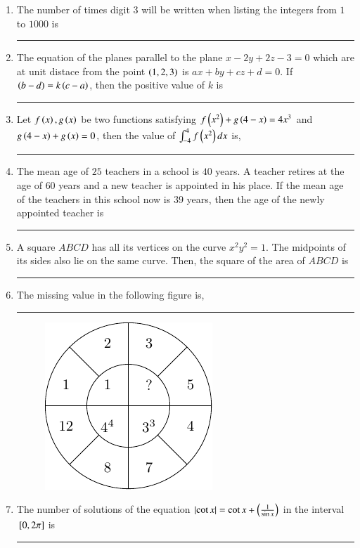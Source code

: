 \documentclass[journal]{IEEEtran}
\begin{document}
\begin{enumerate}
\begin{enumerate}
			\end{enumerate}
	\item The number of times digit $3$ will be written when listing the integers from $1$ to $1000$ is \rule{2cm}{0.1pt}
	\item The equation of the planes parallel to the plane $x-2y+2z-3=0$ which are at unit distace from the point $\left(1,2,3\right)$ is $ax+by+cz+d=0$. If $\left(b-d\right)=k\left(c-a\right)$, then the positive value of $k$ is\rule{2cm}{0.1pt}
	\item Let $f\left(x\right),g\left(x\right)$ be two functions satisfying $f\left(x^2\right)+g\left(4-x\right)=4x^3$ and $g\left(4-x\right)+g\left(x\right)=0$, then the value of $\int_{-4}^4 f\left(x^2\right) dx$ is,\rule{2cm}{0.1pt}
	\item The mean age of $25$ teachers in a school is $40$ years. A teacher retires at the age of $60$ years and a new teacher is appointed in his place. If the mean age of the teachers in this school now is $39$ years, then the age of the newly appointed teacher is\rule{2cm}{0.1pt}
	\item A square $ABCD$ has all its vertices on the curve $x^2y^2 = 1$. The midpoints of its sides also lie on the same curve. Then, the square of the area of $ABCD$ is\rule{2cm}{0.1pt}
	\item The missing value in the following figure is,\rule{2cm}{0.1pt}
		\begin{figure}[H]
			\centering
			\includegraphics[scale=1]{figs26/fig26.png}
			\label{stemplot}
		\end{figure}
	\item The number of solutions of the equation $\left\vert\cot x\right\vert=\cot x +\left(\frac{1}{\sin x}\right)$ in the interval ${}\left[0, 2\pi\right]$ is\rule{2cm}{0.1pt}

\end{enumerate}
\end{document}
